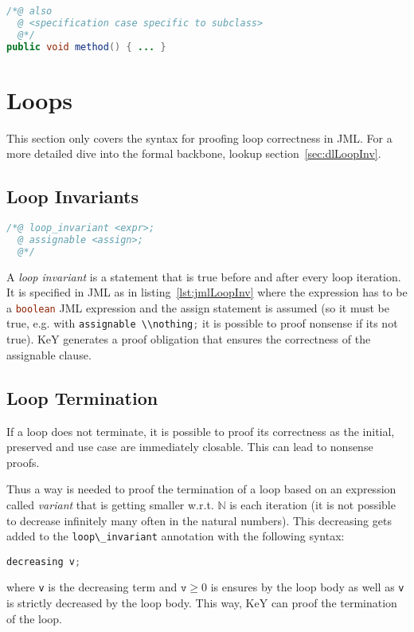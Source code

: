 \documentclass[a4paper, 11pt, accentcolor = tud3b]{tudreport}
\newcommand{\inlineJava}[1]{\lstinline[language = Java]|#1|}
\begin{document}
			\begin{lstlisting}[caption = { Inheritance in JML }, label = lst:jmlInherit, language = Java]
/*@ also
  @ <specification case specific to subclass>
  @*/
public void method() { ... }
			\end{lstlisting}

		\section{Loops}
			This section only covers the syntax for proofing loop correctness in JML. For a more detailed dive into the formal backbone, lookup section~\ref{sec:dlLoopInv}.
		
			\subsection{Loop Invariants}
				\label{sec:loopinv}
			
				\begin{lstlisting}[caption = { Loop Invariants in JML }, label = lst:jmlLoopInv, language = Java]
/*@ loop_invariant <expr>;
  @ assignable <assign>;
  @*/
				\end{lstlisting}
			
				A \textit{loop invariant} is a statement that is true before and after every loop iteration. It is specified in JML as in listing~\ref{lst:jmlLoopInv} where the expression has to be a \inlineJava{boolean} JML expression and the assign statement is assumed (so it must be true, e.g. with \inlineJava{assignable \\nothing;} it is possible to proof nonsense if its not true). KeY generates a proof obligation that ensures the correctness of the assignable clause.
	
			\subsection{Loop Termination}
				If a loop does not terminate, it is possible to proof its correctness as the initial, preserved and use case are immediately closable. This can lead to nonsense proofs.
				
				Thus a way is needed to proof the termination of a loop based on an expression called \textit{variant} that is getting smaller w.r.t. \( \mathbb{N} \) is each iteration (it is not possible to decrease infinitely many often in the natural numbers). This decreasing gets added to the \inlineJava{loop\_invariant} annotation with the following syntax:
				\begin{center}
					\inlineJava{decreasing v;}
				\end{center}
				where \texttt{v} is the decreasing term and \( \texttt{v} \geq 0 \) is ensures by the loop body as well as \texttt{v} is strictly decreased by the loop body. This way, KeY can proof the termination of the loop.
\end{document}
